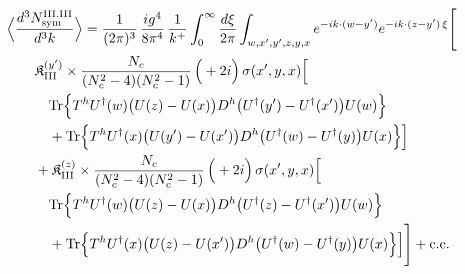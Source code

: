 \begingroup\small
\begin{align}\label{eq:S-III.III-3}
&\Big\langle\frac{d^{3}N^{\rm III.III}_{{\rm sym}}}{d^{3}k}\Big\rangle=\frac{1}{(2\pi)^{3}}\, \frac{ig^{4}}{8\pi^{4}}\, \frac{1}{k^{+}} \int_{0}^{\infty}\frac{d\xi}{2\pi} \int_{w,x',y',z,y,x}e^{-ik\cdot(w-y')}e^{-ik\cdot(z-y')\,\xi}\Bigg[\notag\\
&\quad\quad \mathfrak{K}^{(y')}_{\rm III} \times \frac{N_{c}}{(N_{c}^{2}-4)(N_{c}^{2}-1)}\, \Big(+2i\Big)\, \sigma(x',y,x)\Big[\notag\\
&\quad\quad\quad {\rm Tr}\Big\{T^{h}U^{\dagger}(w)\big(U(z)-U(x)\big)D^{h}\big(U^{\dagger}(y')-U^{\dagger}(x')\big)U(w)\Big\}\notag\\
&\quad\quad\quad +{\rm Tr}\Big\{T^{h}U^{\dagger}(x)\big(U(y')-U(x')\big)D^{h}\big(U^{\dagger}(w)-U^{\dagger}(y)\big)U(x)\Big\}\Big]\notag\\
&\quad\quad + \mathfrak{K}^{(z)}_{\rm III} \times \frac{N_{c}}{(N_{c}^{2}-4)(N_{c}^{2}-1)}\, \Big(+2i\Big)\, \sigma(x',y,x)\Big[\notag\\
&\quad\quad\quad {\rm Tr}\Big\{T^{h}U^{\dagger}(w)\big(U(z)-U(x)\big)D^{h}\big(U^{\dagger}(z)-U^{\dagger}(x')\big)U(w)\Big\}\notag\\
&\quad\quad\quad +{\rm Tr}\Big\{T^{h}U^{\dagger}(x)\big(U(z)-U(x')\big)D^{h}\big(U^{\dagger}(w)-U^{\dagger}(y)\big)U(x)\Big\}\Big]\Bigg] +{\rm c.c.}
\end{align}
\endgroup
